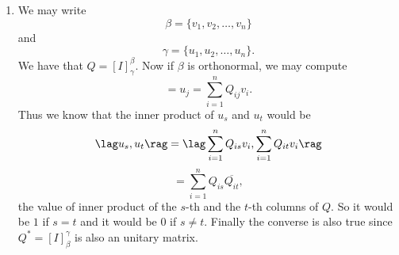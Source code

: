 \begin{enumerate}
\begin{enumerate}
Here the we have 
\[Q=\begin{pmatrix}\frac{1}{\sqrt{2}} & \frac{1}{\sqrt{3}} & -\frac{1}{\sqrt{6}}\cr \frac{1}{\sqrt{2}} & -\frac{1}{\sqrt{3}} & \frac{1}{\sqrt{6}}\cr 0 & \frac{1}{\sqrt{3}} & \frac{\sqrt{2}}{\sqrt{3}}\end{pmatrix}\]
and 
\[R=\begin{pmatrix}\sqrt{2} & \sqrt{2} & {2}^{\frac{3}{2}}\cr 0 & \sqrt{3} & \frac{1}{\sqrt{3}}\cr 0 & 0 & \frac{\sqrt{2}}{\sqrt{3}}\end{pmatrix}.\]
\item First that $Q_1$, $Q_2$ and $R_1$, $R_2$ are invertible otherwise $A$ cannot be invertible. Also, since $Q_1$, $Q_2$ is unitary, we have $Q_1^*=Q_1^{-1}$ and $Q_2^*=Q_2^{-1}$. Now we may observe that $Q_1Q_2^*=R_2R_1^{-1}$ is an unitary matrix. But $R_2R_1^{-1}$ is upper triangular since $R_2$ and the inverse of an upper triangular matrix $R_1$ are triangular matrices. So $D=R_2R_1^{-1}$ is both upper triangular and unitary. It could only be a unitary diagonal matrix.
\item Denote $b$ by $\begin{pmatrix}1\\11\\-1\end{pmatrix}$. Now we have $A=QR=b$. Since $Q$ is unitary, we have $R=Q^*b$. Now we have 
\[\begin{pmatrix}\sqrt{2} & \sqrt{2} & {2}^{\frac{3}{2}}\cr 0 & \sqrt{3} & \frac{1}{\sqrt{3}}\cr 0 & 0 & \frac{\sqrt{2}}{\sqrt{3}}\end{pmatrix}=R=Q^*b=\begin{pmatrix}3\cdot {2}^{\frac{3}{2}}\cr -\frac{11}{\sqrt{3}}\cr \frac{{2}^{\frac{5}{2}}}{\sqrt{3}}\end{pmatrix}.\]
Then we may solve it to get the answer $x=3$, $y=-5$, and $z=4$.
\end{enumerate}
\item We may write 
\[\beta=\{v_1,v_2,\ldots ,v_n\}\]
and 
\[\gamma=\{u_1,u_2,\ldots ,u_n\}.\]
We have that $Q=[I]_{\gamma}^{\beta}$. Now if $\beta $ is orthonormal, we may compute 
\[=u_j=\sum_{i=1}^n{Q_{ij}v_i}.\]
Thus we know that the inner product of $u_s$ and $u_t$ would be 
\[\lag u_s,u_t\rag =\lag \sum_{i=1}^n{Q_{is}v_i},\sum_{i=1}^n{Q_{it}v_i}\rag \]
\[=\sum_{i=1}^n{Q_{is}\overline{Q_{it}}},\]
the value of inner product of the $s$-th and the $t$-th columns of $Q$. So it would be $1$ if $s=t$ and it would be $0$ if $s\neq t$. Finally the converse is also true since $Q^*=[I]_{\beta}^{\gamma}$ is also an unitary matrix.

\end{enumerate}
